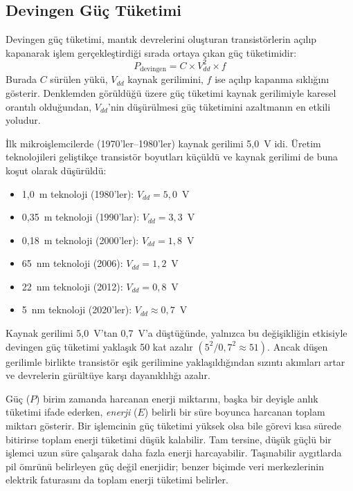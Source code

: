 \subsection{Devingen Güç Tüketimi}
\label{sec:devingen-guc}

Devingen güç tüketimi, mantık devrelerini oluşturan transistörlerin açılıp kapanarak işlem gerçekleştirdiği sırada ortaya çıkan güç tüketimidir:
\begin{equation}
P_{\text{devingen}} = C \times V_{dd}^2 \times f
\label{eq:devingen-guc}
\end{equation}
Burada $C$ sürülen yükü, $V_{dd}$ kaynak gerilimini, $f$ ise açılıp kapanma sıklığını gösterir. Denklemden görüldüğü üzere güç tüketimi kaynak gerilimiyle karesel orantılı olduğundan, $V_{dd}$'nin düşürülmesi güç tüketimini azaltmanın en etkili yoludur.

\begin{bilginot}
İlk mikroişlemcilerde (1970'ler--1980'ler) kaynak gerilimi 5{,}0~V idi. Üretim teknolojileri geliştikçe transistör boyutları küçüldü ve kaynak gerilimi de buna koşut olarak düşürüldü:
\begin{itemize}[nosep]
    \item 1{,}0~\textmu m teknoloji (1980'ler): $V_{dd} = 5{,}0$~V
    \item 0{,}35~\textmu m teknoloji (1990'lar): $V_{dd} = 3{,}3$~V
    \item 0{,}18~\textmu m teknoloji (2000'ler): $V_{dd} = 1{,}8$~V
    \item 65~nm teknoloji (2006): $V_{dd} = 1{,}2$~V
    \item 22~nm teknoloji (2012): $V_{dd} = 0{,}8$~V
    \item 5~nm teknoloji (2020'ler): $V_{dd} \approx 0{,}7$~V
\end{itemize}
Kaynak gerilimi 5{,}0~V'tan 0{,}7~V'a düştüğünde, yalnızca bu değişikliğin etkisiyle devingen güç tüketimi yaklaşık 50 kat azalır $(5^2 / 0{,}7^2 \approx 51)$. Ancak düşen gerilimle birlikte transistör eşik gerilimine yaklaşıldığından sızıntı akımları artar ve devrelerin gürültüye karşı dayanıklılığı azalır.
\end{bilginot}

Güç ($P$) birim zamanda harcanan enerji miktarını, başka bir deyişle anlık tüketimi ifade ederken, \emph{enerji} ($E$) belirli bir süre boyunca harcanan toplam miktarı gösterir. Bir işlemcinin güç tüketimi yüksek olsa bile görevi kısa sürede bitirirse toplam enerji tüketimi düşük kalabilir. Tam tersine, düşük güçlü bir işlemci uzun süre çalışarak daha fazla enerji harcayabilir. Taşınabilir aygıtlarda pil ömrünü belirleyen güç değil enerjidir; benzer biçimde veri merkezlerinin elektrik faturasını da toplam enerji tüketimi belirler.

